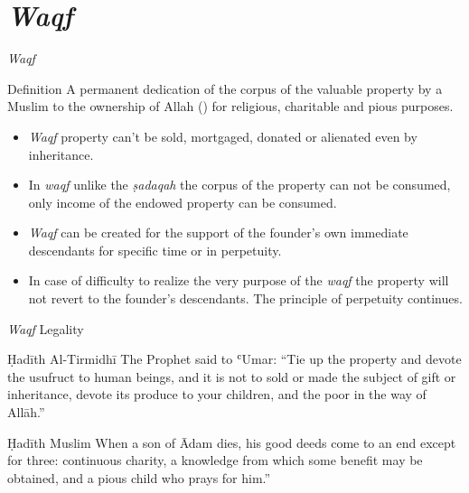 \section{\textit{Waqf} \hfill {}}

\begin{frame}{\textit{Waqf} \hfill {}}
\begin{block}{Definition}
A permanent dedication of the corpus of the valuable property by a Muslim to the ownership of Allah ({}) for religious, charitable and pious purposes.
\end{block}
\end{frame}

\begin{frame}
\begin{itemize}
\item  \textit{Waqf} property can't be sold, mortgaged, donated or alienated even by inheritance.
\item In \textit{waqf} unlike the \textit{ṣadaqah} the corpus of the property can not be consumed, only income of the endowed property can be consumed.
\item \textit{Waqf} can be created for the support of the founder’s own immediate descendants for specific time or in perpetuity. 
\item In case of difficulty to realize the very purpose of the \textit{waqf} the property will not revert to the founder’s descendants. The principle of perpetuity continues.
\end{itemize}
\end{frame}

\begin{frame}{\textit{Waqf} Legality}
\begin{block}{Ḥadīth \hfill Al-Tirmidhī}
The Prophet \pbuh said to ʿUmar:
“Tie up the property and devote the usufruct to human beings, and it is not to sold or made the subject of gift or inheritance, devote its produce to your children, and the poor in the way of Allāh.”
\end{block}
\begin{block}{Ḥadīth \hfill Muslim}
When a son of Ādam dies, his good deeds come to an end except for three: continuous charity, a knowledge from which some benefit may be obtained, and a pious child who prays for him.”
\end{block}
\end{frame}

